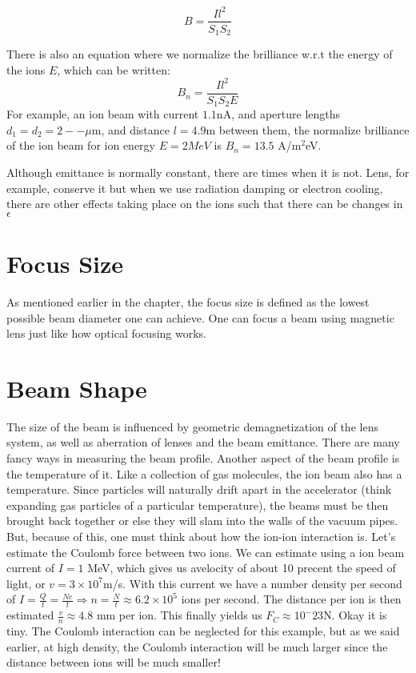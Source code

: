 \begin{equation}
B = \frac{I l^2}{S_1 S_2}
\label{eq:bright}
\end{equation}

There is also an equation where we normalize the brilliance w.r.t the energy of the ions $E$, which can be written:
$$ B_n = \frac{I l^2}{S_1 S_2 E} $$
For example, an ion beam with current $1.1$nA, and aperture lengths $d_1 = d_2 = 2-- \mu$m, and distance $l = 4.9$m between them, the normalize brilliance of the ion beam for ion energy $E = 2 MeV$ is $B_n = 13.5$ A/m$^2$eV.


Although emittance is normally constant, there are times when it is not.
Lens, for example, conserve it but when we use radiation damping or electron cooling, there are other effects taking place on the ions such that there can be changes in $\epsilon$


\section{Focus Size}\label{sec:focus-size}
As mentioned earlier in the chapter, the focus size is defined as the lowest possible beam diameter one can achieve.
One can focus a beam using magnetic lens just like how optical focusing works.

\section{Beam Shape}\label{sec:beam-shape}
The size of the beam is influenced by geometric demagnetization of the lens system, as well as aberration of lenses and the beam emittance.
There are many fancy ways in measuring the beam profile.
Another aspect of the beam profile is the temperature of it.
Like a collection of gas molecules, the ion beam also has a temperature.
Since particles will naturally drift apart in the accelerator (think expanding gas particles of a particular temperature), the beams must be then brought back together or else they will slam into the walls of the vacuum pipes.
But, because of this, one must think about how the ion-ion interaction is.
Let's estimate the Coulomb force between two ions.
We can estimate using a ion beam current of $I = 1$ MeV, which gives us avelocity of about 10 precent the speed of light, or $v = 3\times 10^7 $m/s.
With this current we have a number density per second of $I = \frac{Q}{t} = \frac{Ne}{t} \Rightarrow n = \frac{N}{t} \approx 6.2\times 10^5$ ions per second.
The distance per ion is then estimated $  \frac{v}{n} \approx 4.8$ mm per ion.
This finally yields us $F_C \approx 10^-23$N.
Okay it is tiny.
The Coulomb interaction can be neglected for this example, but as we said earlier, at high density, the Coulomb interaction will be much larger since the distance between ions will be much smaller!


